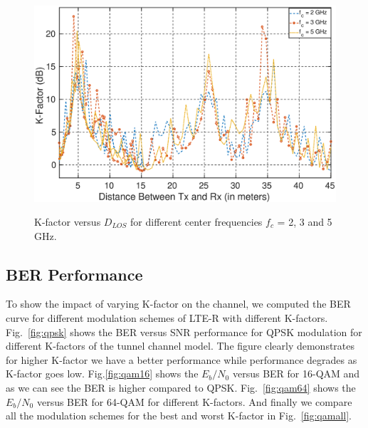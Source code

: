 \begin{figure}[!ht]
\label{kfactor}
\centering
\includegraphics[width=\textwidth,keepaspectratio,height=8cm]{images/Gill/lte_figs/kfactordist.eps} 
\caption{K-factor versus $D_{LOS}$ for different center frequencies $f_c$ = 2, 3 and 5 GHz.}
\end{figure}

\subsection{BER Performance}
To show the impact of varying K-factor on the channel, we computed the BER curve for different modulation schemes of LTE-R with different K-factors. Fig.~\ref{fig:qpsk} shows the BER versus SNR performance for QPSK modulation for different K-factors of the tunnel channel model. The figure clearly demonstrates for higher K-factor we have a better performance while performance degrades as K-factor goes low. Fig.\ref{fig:qam16} shows the $E_b/N_0$ versus BER for 16-QAM and as we can see the BER is higher compared to QPSK. Fig.~\ref{fig:qam64} shows the $E_b/N_0$ versus BER for 64-QAM for different K-factors. And finally we compare all the modulation schemes for the best and worst K-factor in Fig.~\ref{fig:qamall}.

